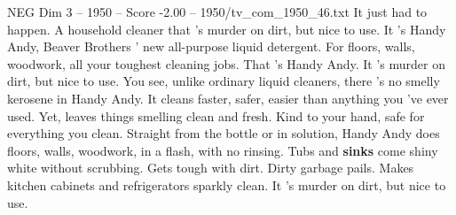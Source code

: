 \begin{textsample}{NEG Dim 3 – 1950 – Score -2.00 – 1950/tv\_com\_1950\_46.txt}  \label{ex:f3_neg_084}
It just had to happen.
A household cleaner that 's murder on dirt, but nice to use.
It 's Handy Andy, Beaver Brothers ' new all-purpose liquid detergent.
For floors, walls, woodwork, all your toughest cleaning jobs.
That 's Handy Andy.
It 's murder on dirt, but nice to use.
You see, unlike ordinary liquid cleaners, there 's no smelly kerosene in Handy Andy.
It cleans faster, safer, easier than anything you 've ever used.
Yet, leaves things smelling clean and fresh.
Kind to your hand, safe for everything you clean.
Straight from the bottle or in solution, Handy Andy does floors, walls, woodwork, in a flash, with no rinsing.
Tubs and \textbf{sinks} come shiny white without scrubbing.
Gets tough with dirt.
Dirty garbage pails.
Makes kitchen cabinets and refrigerators sparkly clean.
It 's murder on dirt, but nice to use.

\end{textsample}
